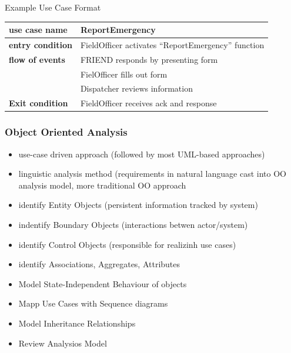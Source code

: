 \documentclass[a4paper, 10pt]{article}
\begin{document}
Example Use Case Format \\
\begin{tabular}{|l|l|}
\hline %
\textbf{use case name}	& ReportEmergency \\
\hline %
\textbf{entry condition}& FieldOfficer activates ``ReportEmergency'' function \\
\hline %
\textbf{flow of events}	& FRIEND responds by presenting form \\
						& FielOfficer fills out form \\
						& Dispatcher reviews information \\
\hline %
\textbf{Exit condition}	& FieldOfficer receives ack and response \\
\hline %
\end{tabular}

\subsubsection{Object Oriented Analysis}
\begin{itemize}
	\item use-case driven approach (followed by most UML-based approaches)
	\item linguistic analysis method (requirements in natural language  \follows cast into OO analysis model, more traditional OO approach
	\item identify Entity Objects (persistent information tracked by system)
	\item indentify Boundary Objects (interactions betwen actor/system)
	\item identify Control Objects (responsible for realizinh use cases)
	\item identify Associations, Aggregates, Attributes
	\item Model State-Independent Behaviour of objects
	\item Mapp Use Cases with Sequence diagrams
	\item Model Inheritance Relationships
	\item Review Analysios Model
\end{itemize}
\end{document}
